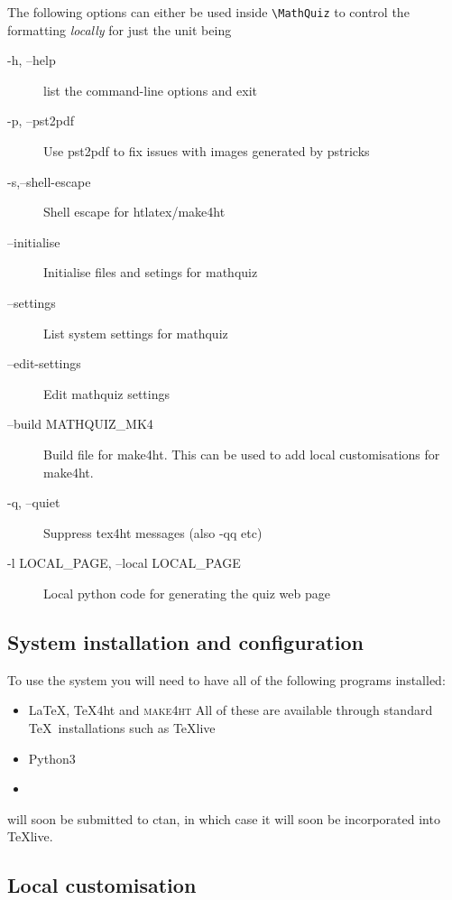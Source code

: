 \documentclass[svgnames]{article}
\begin{document}
    The following options can either be used inside \Verb|\MathQuiz| to
    control the formatting \textit{locally} for just the unit being


    \begin{description}
       \item[ -h, --help]            list the command-line options and exit
       \item[-p, --pst2pdf]
          Use pst2pdf to fix issues with images generated by pstricks
       \item[-s,--shell-escape]
          Shell escape for htlatex/make4ht
       \item[--initialise]
          Initialise files and setings for mathquiz
       \item[--settings]
          List system settings for mathquiz
       \item[--edit-settings]
          Edit mathquiz settings
       \item[--build MATHQUIZ\_MK4]
          Build file for make4ht. This can be used to add local
          customisations for make4ht.

       \item[-q, --quiet]
          Suppress tex4ht messages (also -qq etc)
       \item[-l LOCAL\_PAGE, --local LOCAL\_PAGE]
          Local python code for generating the quiz web page
    \end{description}

\subsection{System installation and configuration}\label{S:installation}

    To use the system you will need to have all of the following programs installed:
    \begin{itemize}
         \item \LaTeX, \TeX 4ht and \textsc{make4ht}
         All of these are available through standard \TeX\ installations
         such as \TeX live
         \item Python3
         \item \MathQuiz
    \end{itemize}

    \MathQuiz will soon be submitted to ctan, in which case it will soon
    be incorporated into \TeX live.

\subsection{Local customisation}
\end{document}
